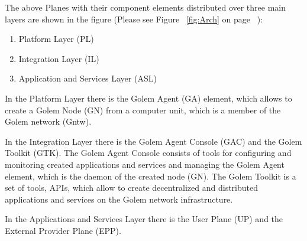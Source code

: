 The above Planes with their component elements distributed over three main layers 
are shown in the figure 
(Please see Figure ~\ref{fig:Arch} on page ~\pageref{fig:Arch}):

\begin{enumerate}
	\item Platform Layer (PL)
	\item Integration Layer (IL)
	\item Application and Services Layer (ASL)
\end{enumerate}


In the Platform Layer there is the Golem Agent (GA) element, which allows to create a Golem Node (GN) from a computer unit, 
which is a member of the Golem network (Gntw).

In the Integration Layer there is the Golem Agent Console (GAC) and the Golem Toolkit (GTK). 
The Golem Agent Console consists of tools for configuring and monitoring created applications and services 
and managing the Golem Agent element, which is the daemon of the created node (GN). 
The Golem Toolkit is a set of tools, APIs, which allow to create decentralized and distributed applications and services
on the Golem network infrastructure.

In the Applications and Services Layer there is the User Plane (UP) and the External Provider Plane (EPP).

